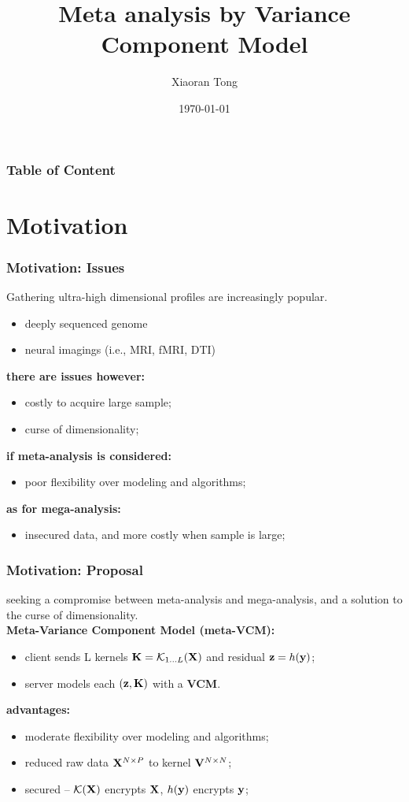 \documentclass{beamer}
\title[Meta-VCM]{Meta analysis by Variance Component Model}
\author{Xiaoran Tong} %
\institute[EPI Biosta,
MSU] %
{ Michigan State University \\ %
  \medskip \textit{tongxia1@msu.edu} \\%
  \textit{qlu@epi.msu.edu} %
} \date{\today} %
\begin{document}
\begin{frame}
  \titlepage %
\end{frame}

\begin{frame}
  \frametitle{Table of
    Content} %
  \tableofcontents
\end{frame}
\section{Motivation}
\begin{frame}\frametitle{Motivation: Issues}
  Gathering ultra-high dimensional profiles are increasingly popular.
  \begin{itemize}
  \item deeply sequenced genome
  \item neural imagings (i.e., MRI, fMRI, DTI)
  \end{itemize}
  \textbf{there are issues however:}
  \begin{itemize}
  \item costly to acquire large sample;
  \item curse of dimensionality;
  \end{itemize}
  \textbf{if meta-analysis is considered:}
  \begin{itemize}
  \item poor flexibility over modeling and algorithms;
  \end{itemize}
  \textbf{as for mega-analysis:}
  \begin{itemize}
  \item insecured data, and more costly when sample is large;
  \end{itemize}
\end{frame}
\begin{frame}
  \frametitle{Motivation: Proposal} %
  seeking a compromise between meta-analysis and mega-analysis, and a
  solution to the curse of dimensionality. \\
  \textbf{Meta-Variance Component Model (meta-VCM):}
  \begin{itemize}
  \item client sends L kernels $\mathbf{K} = \mathcal{K}_{1 \dots L}(\mathbf{X})$ and residual
    $\mathbf{z}=h(\mathbf{y})$;
  \item server models each $(\mathbf{z}, \mathbf{K})$ with a \textbf{VCM}.
  \end{itemize}
  \textbf{advantages:}
  \begin{itemize}
  \item moderate flexibility over modeling and algorithms;
  \item reduced raw data $\mathbf{X}^{N \times P}$ to kernel
    $\mathbf{V}^{N \times N}$;
  \item secured -- $\mathcal{K}(\mathbf{X})$ encrypts $\mathbf{X}$, $h(\mathbf{y})$
    encrypts $\mathbf{y}$;
  \end{itemize}
\end{frame}
\end{document}
